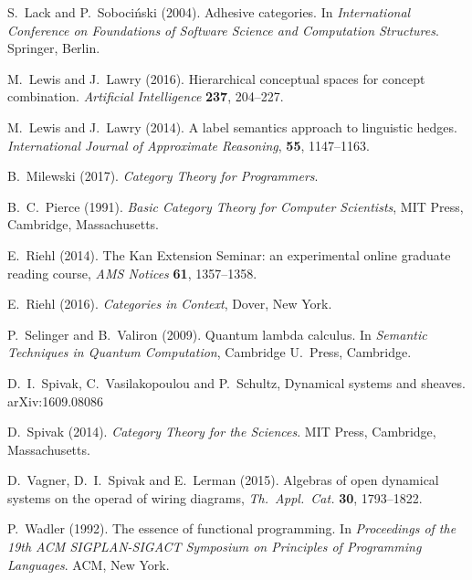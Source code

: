 \documentclass[12pt]{amsart}
\begin{document}
\begin{thebibliography}{99}
 S.\ Lack and P.\ Sobociński (2004). Adhesive
  categories. In \textsl{International Conference on Foundations of
    Software Science and Computation Structures}. Springer, Berlin.

 M.\ Lewis and J.\ Lawry (2016). Hierarchical conceptual spaces for concept combination. \textsl{Artificial Intelligence} \textbf{237}, 204--227.

 M.\ Lewis and J.\ Lawry (2014). A label semantics approach to linguistic hedges. \textsl{International Journal of Approximate Reasoning}, \textbf{55}, 1147--1163.
 
  B.\ Milewski (2017). \textsl{Category Theory for
    Programmers}. 
 
 B.\ C.\ Pierce (1991). \textsl{Basic Category Theory for Computer Scientists}, MIT Press, Cambridge, Massachusetts.
        

 E.\ Riehl (2014). The Kan Extension Seminar: an experimental online graduate reading course, \textsl{AMS Notices} \textbf{61}, 1357--1358.  %

 E.\ Riehl (2016). \textsl{Categories in Context},  Dover, New York.  %

 P.\ Selinger and B.\ Valiron (2009). Quantum lambda calculus.  In \textsl{Semantic Techniques in Quantum Computation}, Cambridge U.\ Press, Cambridge.  %

 D.\ I.\ Spivak, C.\ Vasilakopoulou and P.\ Schultz, Dynamical systems and sheaves.  arXiv:1609.08086   %

 D.\ Spivak (2014). \textsl{Category Theory for the Sciences}. MIT Press, 
Cambridge, Massachusetts.
  
 D.\ Vagner, D.\ I.\ Spivak and E.\ Lerman (2015). Algebras of open dynamical systems on the operad of wiring diagrams, \textsl{Th.\ Appl.\ Cat.} \textbf{30}, 1793--1822.   %

 P.\ Wadler (1992). The essence of functional programming. In \textsl{Proceedings of the 19th ACM SIGPLAN-SIGACT Symposium on Principles of Programming Languages}.  ACM, 
New York.

\end{thebibliography}
\end{document}
